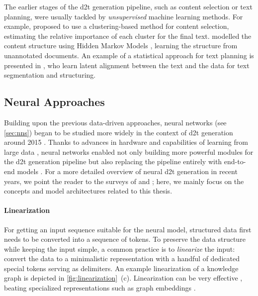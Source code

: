 {The earlier stages of the \ac{d2t} generation pipeline, such as content selection or text planning, were usually tackled by \emph{unsupervised} machine learning methods. For example, \citet{duboue2003statistical} proposed to use a clustering-based method for content selection, estimating the relative importance of each cluster for the final text. \citet{barzilay2004catching} modelled the content structure using Hidden Markov Models \cite{baum1966statistical}, learning the structure from unannotated documents. An example of a statistical approach for text planning is presented in \citet{liang2009learning}, who learn latent alignment between the text and the data for text segmentation and structuring.

\subsection{Neural Approaches}
\label{sec:neural-d2t}
Building upon the previous data-driven approaches, neural networks (see \autoref{sec:nns}) began to be studied more widely in the context of \ac{d2t} generation around 2015 \cite{dusekTrainingNaturalLanguage2015,wen2015toward}. Thanks to advances in hardware \cite{hooker2021hardware} and capabilities of learning from large data \cite{lecun2015deep}, neural networks enabled not only building more powerful modules for the \ac{d2t} generation pipeline but also replacing the pipeline entirely with end-to-end models \cite{dusekEvaluatingStateoftheartEndtoEnd2020}. For a more detailed overview of neural \ac{d2t} generation in recent years, we point the reader to the surveys of \citet{sharmaInnovationsNeuralDatatotext2022} and \citet{lin2023survey}; here, we mainly focus on the concepts and model architectures related to this thesis.


\paragraph{Linearization} For getting an input sequence suitable for the neural model, structured data first needs to be converted into a sequence of tokens. To preserve the data structure while keeping the input simple, a common practice is to \emph{linearize} the input: convert the data to a minimalistic representation with a handful of dedicated special tokens serving as delimiters. An example linearization of a knowledge graph is depicted in \autoref{fig:linearization}~(c). Linearization can be very effective \cite{yang2020improving,hoyle2021promoting,xieUnifiedSKGUnifyingMultiTasking2022}, beating specialized representations such as graph embeddings \cite{marcheggianiDeepGraphConvolutional2018,koncel-kedziorskiTextGenerationKnowledge2019}.

}
